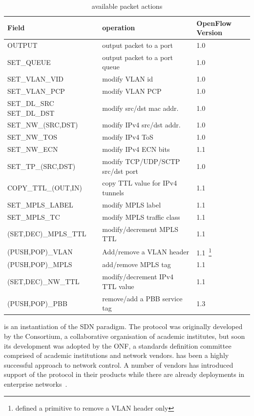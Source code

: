   \begin{table}
  \begin{minipage} [b]{0.49\textwidth} 
    \begin{tabular}{| p{4cm} | p{6cm}  | p{1.5cm} |} 
      \hline
      Field & operation & OpenFlow Version \\ \hline
      OUTPUT & output packet to a port & 1.0 \\ \hline
      SET\_QUEUE & output packet to a port queue & 1.0 \\ \hline
      SET\_VLAN\_VID & modify VLAN id & 1.0 \\ \hline 
      SET\_VLAN\_PCP & modify VLAN PCP & 1.0 \\ \hline
      SET\_DL\_SRC SET\_DL\_DST & modify src/dst mac addr. & 1.0 \\ \hline
      SET\_NW\_(SRC,DST) & modify IPv4 src/dst addr. & 1.0 \\ \hline
      SET\_NW\_TOS & modify IPv4 ToS & 1.0 \\ \hline
      SET\_NW\_ECN & modify IPv4 ECN bits & 1.1 \\ \hline
      SET\_TP\_(SRC,DST) & modify TCP/UDP/SCTP src/dst port & 1.0 \\ \hline
      COPY\_TTL\_(OUT,IN) & copy TTL value for IPv4 tunnels & 1.1  \\ \hline
      SET\_MPLS\_LABEL & modify MPLS label & 1.1 \\ \hline
      SET\_MPLS\_TC & modify MPLS traffic class & 1.1 \\ \hline
      (SET,DEC)\_MPLS\_TTL & modify/decrement MPLS TTL & 1.1 \\ \hline
      (PUSH,POP)\_VLAN & Add/remove a VLAN header & 1.1~\footnote{\of 1.0 defined
        a primitive to remove a VLAN header only} \\ \hline
      (PUSH,POP)\_MPLS & add/remove MPLS tag & 1.1 \\ \hline
      (SET,DEC)\_NW\_TTL & modify/decrement IPv4 TTL value & 1.1 \\ \hline
      (PUSH,POP)\_PBB & remove/add a PBB service tag & 1.3 \\ \hline

    \end{tabular}
  \end{minipage}
  \caption{\of available packet actions} \label{tbl:background:openflow_actions}
\end{table}




\of is an instantiation of the SDN paradigm. The protocol was originally
developed by the \of Consortium, a collaborative organisation of academic
institutes, but soon its development was adopted by the ONF, a standards
definition committee comprised of academic institutions and network vendors. \of has
been a highly successful approach to network control. A number of vendors
has introduced support of the protocol in their products
while there are already \of deployments in enterprise networks~\cite{google_of,Kobayashi:vn}.

